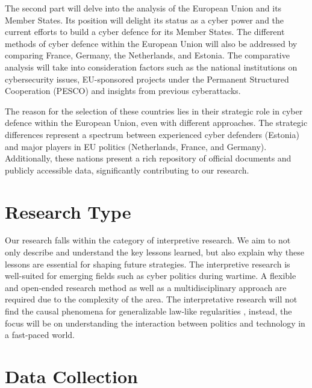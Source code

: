 The second part will delve into the analysis of the European Union and its Member States. Its position will delight its status as a cyber power and the current efforts to build a cyber defence for its Member States. The different methods of cyber defence within the European Union will also be addressed by comparing France, Germany, the Netherlands, and Estonia. The comparative analysis will take into consideration factors such as the national institutions on cybersecurity issues, EU-sponsored projects under the Permanent Structured Cooperation (PESCO) and insights from previous cyberattacks.

The reason for the selection of these countries lies in their strategic role in cyber defence within the European Union, even with different approaches. The strategic differences represent a spectrum between experienced cyber defenders (Estonia) and major players in EU politics (Netherlands, France, and Germany). Additionally, these nations present a rich repository of official documents and publicly accessible data, significantly contributing to our research.

\section{Research Type}

Our research falls within the category of interpretive research. We aim to not only describe and understand the key lessons learned, but also explain why these lessons are essential for shaping future strategies. The interpretive research is well-suited for emerging fields such as cyber politics during wartime. A flexible and open-ended research method as well as a multidisciplinary approach are required due to the complexity of the area. The interpretative research will not find the causal phenomena for generalizable law-like regularities \autocite{lamont_2021_research}, instead, the focus will be on understanding the interaction between politics and technology in a fast-paced world.

\section{Data Collection}

